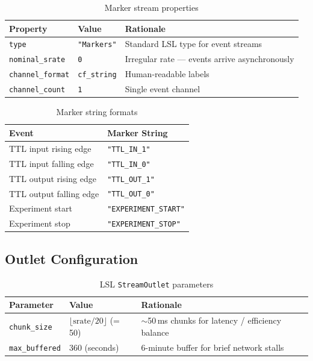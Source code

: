 \documentclass[11pt,a4paper]{article}
\begin{document}
\begin{table}[H]
\centering
\caption{Marker stream properties}
\label{tab:lsl-markers}
\begin{tabular}{|l|l|l|}
\hline
\textbf{Property} & \textbf{Value} & \textbf{Rationale} \\\hline
\hline
\texttt{type} & \texttt{"Markers"} & Standard LSL type for event streams \\
\texttt{nominal\_srate} & \texttt{0} & Irregular rate --- events arrive asynchronously \\
\texttt{channel\_format} & \texttt{cf\_string} & Human-readable labels \\
\texttt{channel\_count} & \texttt{1} & Single event channel \\
\hline
\end{tabular}
\end{table}

\begin{table}[H]
\centering
\caption{Marker string formats}
\label{tab:lsl-marker-strings}
\begin{tabular}{|l|l|}
\hline
\textbf{Event} & \textbf{Marker String} \\\hline
\hline
TTL input rising edge & \texttt{"TTL\_IN\_1"} \\
TTL input falling edge & \texttt{"TTL\_IN\_0"} \\
TTL output rising edge & \texttt{"TTL\_OUT\_1"} \\
TTL output falling edge & \texttt{"TTL\_OUT\_0"} \\
Experiment start & \texttt{"EXPERIMENT\_START"} \\
Experiment stop & \texttt{"EXPERIMENT\_STOP"} \\
\hline
\end{tabular}
\end{table}

\subsection{Outlet Configuration}

\begin{table}[H]
\centering
\caption{LSL \texttt{StreamOutlet} parameters}
\label{tab:lsl-outlet}
\begin{tabular}{|l|l|l|}
\hline
\textbf{Parameter} & \textbf{Value} & \textbf{Rationale} \\\hline
\hline
\texttt{chunk\_size} & $\lfloor \text{srate} / 20 \rfloor$ (= 50) & ${\sim}$50\,ms chunks for latency / efficiency balance \\
\texttt{max\_buffered} & 360 (seconds) & 6-minute buffer for brief network stalls \\
\hline
\end{tabular}
\end{table}
\end{document}
